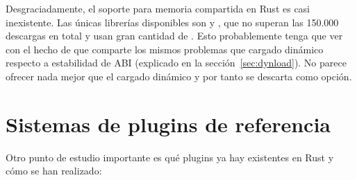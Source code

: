 Desgraciadamente, el soporte para memoria compartida en Rust es casi
inexistente. Las únicas librerías disponibles son  y
, que no superan las 150.000 descargas en total y usan gran
cantidad de \unsafe. Esto probablemente tenga que ver con el hecho de que
comparte los mismos problemas que cargado dinámico respecto a estabilidad de ABI
(explicado en la sección~\ref{sec:dynload}). No parece ofrecer nada mejor que el
cargado dinámico y por tanto se descarta como opción.

\section{Sistemas de plugins de referencia}

Otro punto de estudio importante es qué plugins ya hay existentes en Rust y cómo
se han realizado:

